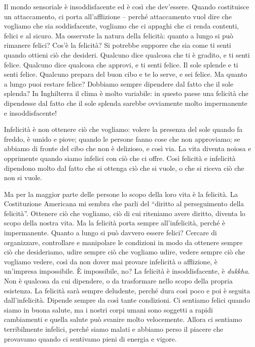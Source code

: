 Il mondo sensoriale è insoddisfacente ed è così che dev'essere. Quando
costituisce un attaccamento, ci porta all'afflizione -- perché
attaccamento vuol dire che vogliamo che sia soddisfacente, vogliamo che
ci appaghi che ci renda contenti, felici e al sicuro. Ma osservate la
natura della felicità: quanto a lungo si può rimanere felici? Cos'è la
felicità? Si potrebbe supporre che sia come ti senti quando ottieni ciò
che desideri. Qualcuno dice qualcosa che ti è gradito, e ti senti
felice. Qualcuno dice qualcosa che approvi, e ti senti felice. Il sole
splende e ti senti felice. Qualcuno prepara del buon cibo e te lo serve,
e sei felice. Ma quanto a lungo puoi restare felice? Dobbiamo sempre
dipendere dal fatto che il sole splenda? In Inghilterra il clima è molto
variabile: in questo paese una felicità che dipendesse dal fatto che il
sole splenda sarebbe ovviamente molto impermanente e insoddisfacente!

Infelicità è non ottenere ciò che vogliamo: volere la presenza del sole
quando fa freddo, è umido e piove; quando le persone fanno cose che non
approviamo; se abbiamo di fronte del cibo che non è delizioso, e così
via. La vita diventa noiosa e opprimente quando siamo infelici con ciò
che ci offre. Così felicità e infelicità dipendono molto dal fatto che
si ottenga ciò che si vuole, o che si riceva ciò che non si vuole.

Ma per la maggior parte delle persone lo scopo della loro vita è la
felicità. La Costituzione Americana mi sembra che parli del ``diritto al
perseguimento della felicità''. Ottenere ciò che vogliamo, ciò di cui
riteniamo avere diritto, diventa lo scopo della nostra vita. Ma la
felicità porta sempre all'infelicità, perché è impermanente. Quanto a
lungo si può davvero essere felici? Cercare di organizzare, controllare
e manipolare le condizioni in modo da ottenere sempre ciò che
desideriamo, udire sempre ciò che vogliamo udire, vedere sempre ciò che
vogliamo vedere, così da non dover mai provare infelicità o afflizione,
è un'impresa impossibile. È impossibile, no? La felicità è
insoddisfacente, è \emph{dukkha}. Non è qualcosa da cui dipendere, o da
trasformare nello scopo della propria esistenza. La felicità sarà sempre
deludente, perché dura così poco e poi è seguita dall'infelicità.
Dipende sempre da così tante condizioni. Ci sentiamo felici quando siamo
in buona salute, ma i nostri corpi umani sono soggetti a rapidi
cambiamenti e quella salute può svanire molto velocemente. Allora ci
sentiamo terribilmente infelici, perché siamo malati e abbiamo perso il
piacere che provavamo quando ci sentivamo pieni di energia e vigore.

